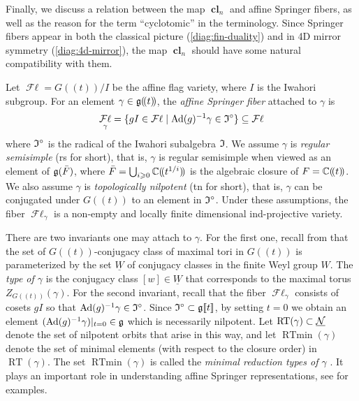 \documentclass[reqno]{amsart}
\DeclareMathOperator{\cFL}{\mathcal{F}\ell}
\DeclareMathOperator{\RTmin}{RTmin}
\DeclareMathOperator{\RT}{RT}
\newcommand{\ubar}[1]{\underline{#1}}
\DeclareMathOperator{\cl}{\mathbf{cl}}
\newcommand{\laurent}[1]{(\!({\ensuremath{#1}})\!)}
\newcommand{\series}[1]{[\![{\ensuremath{#1}}]\!]}
\begin{document}
Finally, we discuss a relation between the map $\cl_n$ and affine Springer fibers, as well as the reason for the term ``cyclotomic'' in the terminology. Since Springer fibers appear in both the classical picture (\ref{diag:fin-duality}) and in 4D mirror symmetry (\ref{diag:4d-mirror}), the map $\cl_n$ should have some natural compatibility with them. 

Let $\cFL = G\laurent{t}/I$ be the affine flag variety, where $I$ is the Iwahori subgroup. For an element $\gamma \in \fg\laurent{t}$, the \textit{affine Springer fiber} attached to $\gamma$ is 
\begin{equation*}
	\cFL_\gamma = \{gI \in \cFL \mid \Ad(g)\inv \gamma \in \fI^\circ \} \subseteq \cFL
\end{equation*}
where $\mathfrak{I}^\circ$ is the radical of the Iwahori subalgebra $\mathfrak{I}$. We assume $\gamma$ is \textit{regular semisimple} (rs for short), that is, $\gamma$ is regular semisimple when viewed as an element of $\mathfrak{g}(\bar F)$, where $\bar F = \bigcup_{i \ge 0} \BC \laurent{t^{1/i}}$ is the algebraic closure of $F = \BC\laurent{t}$. We also assume $\gamma$ is \textit{topologically nilpotent} (tn for short), that is, $\gamma$ can be conjugated under $G\laurent{t}$ to an element in $\mathfrak{I}^\circ$. Under these assumptions, the fiber $\cFL_\gamma$ is a non-empty and locally finite dimensional ind-projective variety. 

There are two invariants one may attach to $\gamma$. For the first one, recall from \cite[\S1 Lemma 2]{KL:Fl} that the set of $G\laurent{t}$-conjugacy class of maximal tori in $G\laurent{t}$ is parameterized by the set $\ubar W$ of conjugacy classes in the finite Weyl group $W$. The \textit{type of $\gamma$} is the conjugacy class $[w] \in \ubar W$ that corresponds to the maximal torus $Z_{G\laurent{t}}(\gamma)$. For the second invariant, recall that the fiber $\cFL_\gamma$ consists of cosets $gI$ so that $\operatorname{Ad}(g)^{-1} \gamma \in \mathfrak{I}^\circ$. Since $\fI^\circ \subset \fg\series{t}$, by setting $t = 0$ we obtain an element $(\operatorname{Ad}(g)^{-1}\gamma)|_{t=0} \in \mathfrak{g}$ which is necessarily nilpotent. Let $\RT(\gamma) \subset \ubar \cN$ denote the set of nilpotent orbits that arise in this way, and let $\RTmin(\gamma)$ denote the set of minimal elements (with respect to the closure order) in $\RT(\gamma)$. The set $\RTmin(\gamma)$ is called the \textit{minimal reduction types of $\gamma$} \cite{Yun:RTmin}. It plays an important role in understanding affine Springer representations, see \cite{Jakob-Yun,Chua,Chua:RTmin} for examples.
\end{document}
